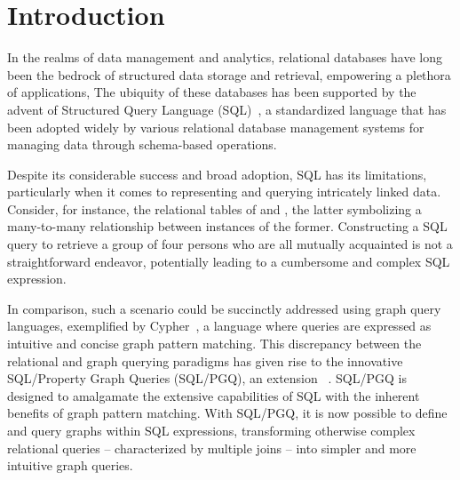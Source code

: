 \section{Introduction}
\label{sec:introduction}

In the realms of data management and analytics, relational databases have long been the bedrock of structured data storage and retrieval, empowering a plethora of applications,%
The ubiquity of these databases has been supported by the advent of Structured Query Language (SQL)~\cite{chamberlin1974sequel}, a standardized language that has been adopted widely by various relational database management systems for managing data through schema-based operations. %

Despite its considerable success and broad adoption, SQL has its limitations, particularly when it comes to representing and querying intricately linked data. Consider, for instance, the relational tables of  and , the latter symbolizing a many-to-many relationship between instances of the former. Constructing a SQL query to retrieve a group of four persons who are all mutually acquainted is not a straightforward endeavor, potentially leading to a cumbersome and complex SQL expression.

In comparison, such a scenario could be succinctly addressed using graph query languages, exemplified by Cypher~\cite{opencypher}, a language where queries are expressed as intuitive and concise graph pattern matching. This discrepancy between the relational and graph querying paradigms has given rise to the innovative SQL/Property Graph Queries (SQL/PGQ), an extension ~\cite{sql-pgq}. SQL/PGQ is designed to amalgamate the extensive capabilities of SQL with the inherent benefits of graph pattern matching. With SQL/PGQ, it is now possible to define and query graphs within SQL expressions, transforming otherwise complex relational queries -- characterized by multiple joins -- into simpler and more intuitive graph queries.


